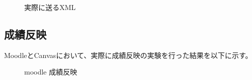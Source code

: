 \begin{figure}[htbp]
  \begin{center}
    \caption{実際に送るXML}
    \label{fig:XML}
  \end{center}
\end{figure}

\subsection{成績反映}
MoodleとCanvasにおいて、実際に成績反映の実験を行った結果を以下に示す。


\begin{figure}[htbp]
  \begin{center}
    \caption{moodle 成績反映}
    \label{fig:moodle score}
  \end{center}
\end{figure}

